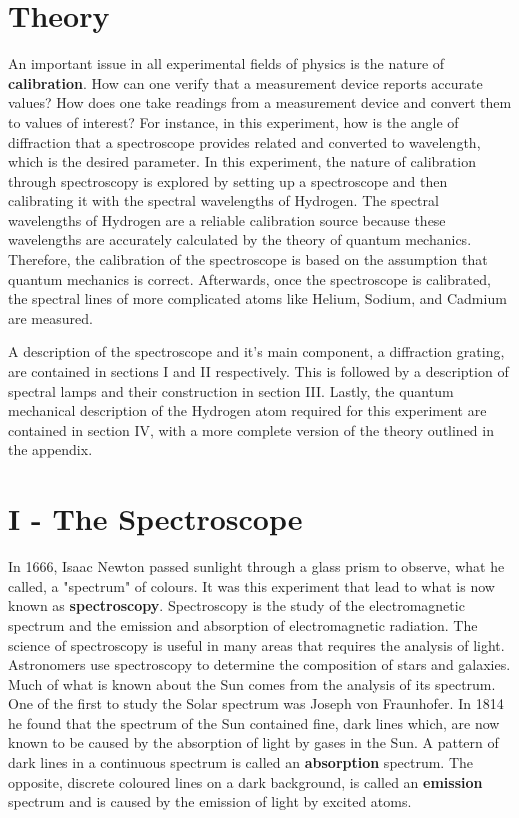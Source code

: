 \section{Theory}
An important issue in all experimental fields of physics is the nature of {\bf calibration}. How can one verify that a measurement device reports accurate values? How does one take readings from a measurement device and convert them to values of interest? For instance, in this experiment, how is the angle of diffraction that a spectroscope provides related and converted to wavelength, which is the desired parameter. In this experiment, the nature of calibration through spectroscopy is explored by setting up a spectroscope and then calibrating it with the spectral wavelengths of Hydrogen. The spectral wavelengths of Hydrogen are a reliable calibration source because these wavelengths are accurately calculated by the theory of quantum mechanics. Therefore, the calibration of the spectroscope is based on the assumption that quantum mechanics is correct. Afterwards, once the spectroscope is calibrated, the spectral lines of more complicated atoms like Helium, Sodium, and Cadmium are measured.

A description of the spectroscope and it's main component, a diffraction grating, are contained in sections I and II respectively. This is followed by a description of spectral lamps and their construction in section III. Lastly, the quantum mechanical description of the Hydrogen atom required for this experiment are contained in section IV, with a more complete version of the theory outlined in the appendix.

\section{I - The Spectroscope}
In 1666, Isaac Newton passed sunlight through a glass prism to observe, what he called, a "spectrum" of colours. It was this experiment that lead to what is now known as {\bf spectroscopy}. Spectroscopy is the study of the electromagnetic spectrum and the emission and absorption of electromagnetic radiation. The science of spectroscopy is useful in many areas that requires the analysis of light. Astronomers use spectroscopy to determine the composition of stars and galaxies. Much of what is known about the Sun comes from the analysis of its spectrum. One of the first to study the Solar spectrum was Joseph von Fraunhofer. In 1814 he found that the spectrum of the Sun contained fine, dark lines which, are now known to be caused by the absorption of light by gases in the Sun. A pattern of dark lines in a continuous spectrum is called an {\bf absorption} spectrum. The opposite, discrete coloured lines on a dark background, is called an {\bf emission} spectrum and is caused by the emission of light by excited atoms.

